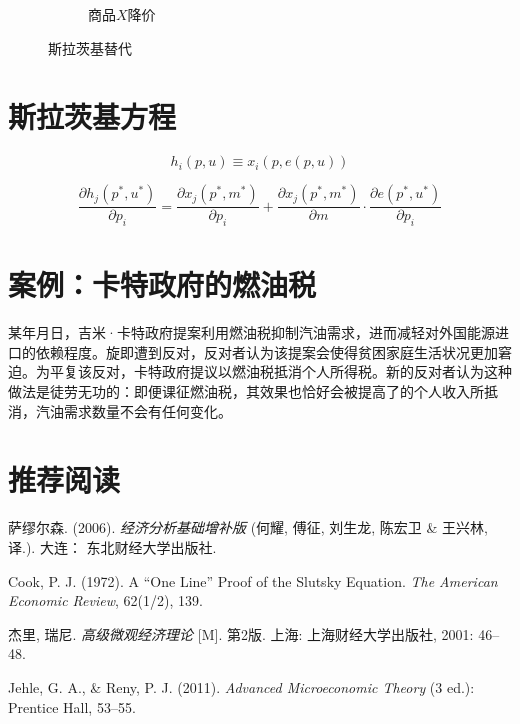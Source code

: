 \begin{figure}[!h]
{{\begin{subfigure}[b]{0.5\textwidth}
\caption{商品$X$降价}
\label{fig:slutsky-substitution-effects-down}
\end{subfigure}%
\caption[收入效应与替代效应：斯拉茨基替代]{斯拉茨基替代}
\label{fig:slutsky-substitution-effects}%
}}
\end{figure}

\section{斯拉茨基方程}

\[{h_i}(p,u) \equiv {x_i}(p,e(p,u))\]

\[\frac{{\partial {h_j}({p^*},{u^*})}}{{\partial {p_i}}} = \frac{{\partial {x_j}({p^*},{m^*})}}{{\partial {p_i}}} + \frac{{\partial {x_j}({p^*},{m^*})}}{{\partial m}}\cdot\frac{{\partial e({p^*},{u^*})}}{{\partial {p_i}}}\]

\section*{案例：卡特政府的燃油税}
某年月日，吉米·卡特政府提案利用燃油税抑制汽油需求，进而减轻对外国能源进口的依赖程度。旋即遭到反对，反对者认为该提案会使得贫困家庭生活状况更加窘迫。为平复该反对，卡特政府提议以燃油税抵消个人所得税。新的反对者认为这种做法是徒劳无功的：即便课征燃油税，其效果也恰好会被提高了的个人收入所抵消，汽油需求数量不会有任何变化。

\section*{推荐阅读}

\begin{asparaenum}
\item 萨缪尔森. (2006). \emph{经济分析基础增补版} (何耀, 傅征, 刘生龙, 陈宏卫 \& 王兴林, 译.). 大连： 东北财经大学出版社.
\item Cook, P. J. (1972). A ``One Line'' Proof of the Slutsky Equation. \emph{The American Economic Review}, 62(1/2), 139.
\item 杰里, 瑞尼. \emph{高级微观经济理论} [M]. 第2版. 上海: 上海财经大学出版社, 2001: 46--48.
\item Jehle, G. A., \& Reny, P. J. (2011). \emph{Advanced Microeconomic Theory} (3 ed.): Prentice Hall, 53--55.
\end{asparaenum}
